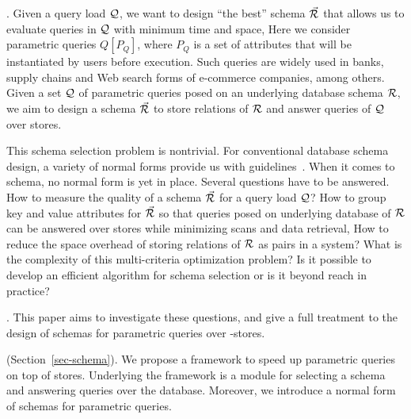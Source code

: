 \vspace{0.36ex}

. %
Given a query load
$\mathcal Q$, we want to design ``the best'' \baav schema
$\vec{{\mathcal R}}$ that allows us to evaluate queries in $\mathcal Q$
with minimum time and space, 
Here we consider parametric \SQL 
queries $Q[P_Q]$, where $P_Q$ is a set of attributes
that will be instantiated by users before execution.
Such queries are widely used in banks, supply chains and
Web search forms of e-commerce companies, among others.
Given a
set $\mathcal Q$ of parametric \SQL queries posed on an underlying
database schema ${\mathcal R}$, we aim to design a \baav schema
$\vec{{\mathcal R}}$ to store relations of ${\mathcal R}$ and 
answer queries of $\mathcal Q$ over \kv stores.

\vspace{0.36ex}
This schema selection problem is nontrivial.
For conventional database schema design, a variety of
normal forms  provide us with
guidelines~\cite{AbHuVi1995}.
When it comes to \baav schema, no normal form is
yet in place. Several %
questions have to be answered.
How to measure
the quality of a \baav schema $\vec{{\mathcal R}}$ for a query load $\mathcal Q$?
How to group key and value attributes for $\vec{{\mathcal R}}$
so that queries posed on underlying database of ${\mathcal R}$
can be answered over \kv stores while minimizing scans and
data retrieval, 
How to reduce the space overhead of
storing relations of ${\mathcal R}$ as \baav pairs 
in a \kv system?
What is the complexity of this multi-criteria
optimization problem? Is it possible
to develop an efficient algorithm for schema
selection or is it beyond reach in practice?


. This paper aims to investigate %
these questions, and give a full treatment to the design of
\baav schemas for parametric \SQL queries over \kv-stores.

 (Section~\ref{sec-schema}). We propose a
framework to speed up parametric \SQL queries on top of \baav stores.
Underlying the framework is a module for selecting a \baav schema
and answering queries over the \baav database. %
Moreover, we introduce
a normal form of \baav schemas for parametric \SQL queries.

